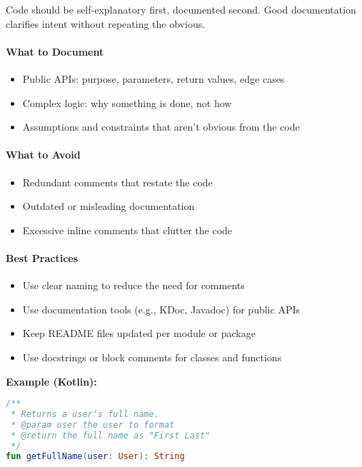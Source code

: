 \documentclass[a4paper,12pt]{article}
\begin{document}
Code should be self-explanatory first, documented second. Good documentation clarifies intent without repeating the obvious.

\paragraph{What to Document}

\begin{itemize}
  \item Public APIs: purpose, parameters, return values, edge cases
  \item Complex logic: why something is done, not how
  \item Assumptions and constraints that aren't obvious from the code
\end{itemize}

\paragraph{What to Avoid}

\begin{itemize}
  \item Redundant comments that restate the code
  \item Outdated or misleading documentation
  \item Excessive inline comments that clutter the code
\end{itemize}

\paragraph{Best Practices}

\begin{itemize}
  \item Use clear naming to reduce the need for comments
  \item Use documentation tools (e.g., KDoc, Javadoc) for public APIs
  \item Keep README files updated per module or package
  \item Use docstrings or block comments for classes and functions
\end{itemize}

\textbf{Example (Kotlin):}
\begin{lstlisting}[language=Kotlin]
/**
 * Returns a user's full name.
 * @param user the user to format
 * @return the full name as "First Last"
 */
fun getFullName(user: User): String
\end{lstlisting}
\end{document}
